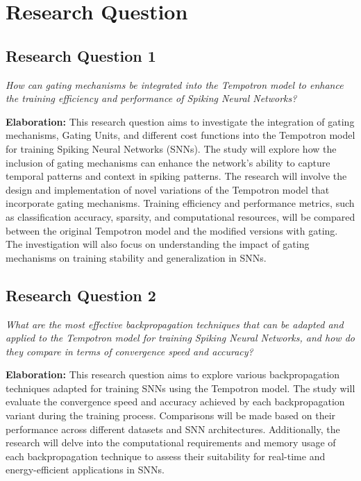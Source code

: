 \chapter{Research Question}
\label{chap:rq}

\section*{Research Question 1}
\textit{How can gating mechanisms be integrated into the Tempotron model to enhance the training efficiency and performance of Spiking Neural Networks?}

\textbf{Elaboration:}
This research question aims to investigate the integration of gating mechanisms, Gating Units, and different cost functions into the Tempotron model for training Spiking Neural Networks (SNNs). The study will explore how the inclusion of gating mechanisms can enhance the network's ability to capture temporal patterns and context in spiking patterns. The research will involve the design and implementation of novel variations of the Tempotron model that incorporate gating mechanisms. Training efficiency and performance metrics, such as classification accuracy, sparsity, and computational resources, will be compared between the original Tempotron model and the modified versions with gating. The investigation will also focus on understanding the impact of gating mechanisms on training stability and generalization in SNNs.

\section*{Research Question 2}
\textit{What are the most effective backpropagation techniques that can be adapted and applied to the Tempotron model for training Spiking Neural Networks, and how do they compare in terms of convergence speed and accuracy?}

\textbf{Elaboration:}
This research question aims to explore various backpropagation techniques adapted for training SNNs using the Tempotron model. The study will evaluate the convergence speed and accuracy achieved by each backpropagation variant during the training process. Comparisons will be made based on their performance across different datasets and SNN architectures. Additionally, the research will delve into the computational requirements and memory usage of each backpropagation technique to assess their suitability for real-time and energy-efficient applications in SNNs.

